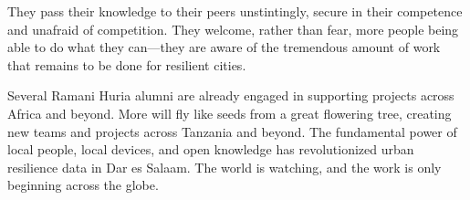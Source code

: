 \documentclass[a4paper,12pt,twoside]{article}
\begin{document}
\begin{multicols}{2}
They pass their knowledge to their peers unstintingly, secure in their competence and unafraid of competition. They welcome, rather than fear, more people being able to do what they can---they are aware of the tremendous amount of work that remains to be done for resilient cities. 

Several Ramani Huria alumni are already engaged in supporting projects across Africa and beyond. More will fly like seeds from a great flowering tree, creating new teams and projects across Tanzania and beyond. The fundamental power of local people, local devices, and open knowledge has revolutionized urban resilience data in Dar es Salaam. The world is watching, and the work is only beginning across the globe.

\end{multicols}

\newpage
\end{document}
